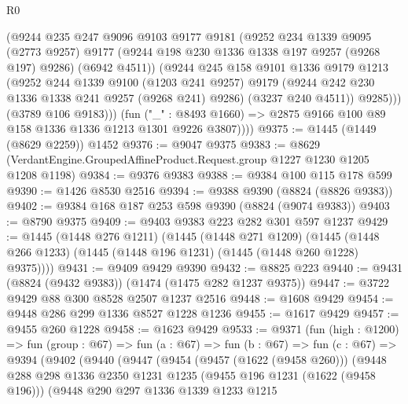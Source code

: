 \begin{lexlean}{R0}
\begin{coremodule}
                (@9244
                  @235
                  @247
                  @9096
                  @9103
                  @9177
                  @9181
                  (@9252
                    @234
                    @1339
                    @9095
                    (@2773 @9257)
                    @9177
                    (@9244 @198 @230 @1336 @1338 @197 @9257 (@9268 @197) @9286)
                    (@6942 @4511))
                  (@9244
                    @245
                    @158
                    @9101
                    @1336
                    @9179
                    @1213
                    (@9252
                      @244
                      @1339
                      @9100
                      (@1203 @241 @9257)
                      @9179
                      (@9244 @242 @230 @1336 @1338 @241 @9257 (@9268 @241) @9286)
                      (@3237 @240 @4511))
                    @9285)))
              (@3789 @106 @9183)))
          (fun ("_" : @8493 @1660) =>
          @2875 @9166 @100 @89 @158 @1336 @1336 @1213 @1301 @9226 @3807))))
@9375 := @1445 (@1449 (@8629 @2259)) @1452
@9376 := @9047 @9375
@9383 := @8629 (VerdantEngine.GroupedAffineProduct.Request.group @1227 @1230 @1205 @1208 @1198)
@9384 := @9376 @9383
@9388 := @9384 @100 @115 @178 @599
@9390 := @1426 @8530 @2516
@9394 := @9388 @9390 (@8824 (@8826 @9383))
@9402 := @9384 @168 @187 @253 @598 @9390 (@8824 (@9074 @9383))
@9403 := @8790 @9375
@9409 := @9403 @9383 @223 @282 @301 @597 @1237
@9429 := @1445
    (@1448 @276 @1211)
    (@1445
      (@1448 @271 @1209)
      (@1445 (@1448 @266 @1233) (@1445 (@1448 @196 @1231) (@1445 (@1448 @260 @1228) @9375))))
@9431 := @9409 @9429 @9390
@9432 := @8825 @223
@9440 := @9431 (@8824 (@9432 @9383)) (@1474 (@1475 @282 @1237 @9375))
@9447 := @3722 @9429 @88 @300 @8528 @2507 @1237 @2516
@9448 := @1608 @9429
@9454 := @9448 @286 @299 @1336 @8527 @1228 @1236
@9455 := @1617 @9429
@9457 := @9455 @260 @1228
@9458 := @1623 @9429
@9533 := @9371
    (fun (high : @1200) =>
    fun (group : @67) =>
    fun (a : @67) =>
    fun (b : @67) =>
    fun (c : @67) =>
    @9394
      (@9402
        (@9440
          (@9447
            (@9454
              (@9457 (@1622 (@9458 @260)))
              (@9448
                @288
                @298
                @1336
                @2350
                @1231
                @1235
                (@9455 @196 @1231 (@1622 (@9458 @196)))
                (@9448
                  @290
                  @297
                  @1336
                  @1339
                  @1233
                  @1215

\end{coremodule}
\end{lexlean}

